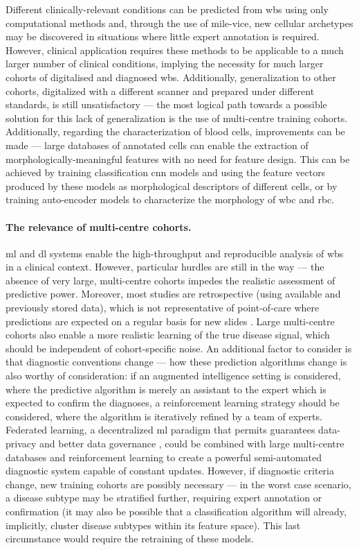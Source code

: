 Different clinically-relevant conditions can be predicted from \ac{wbs} using only computational methods and, through the use of \ac{mile-vice}, new cellular archetypes may be discovered in situations where little expert annotation is required. However, clinical application requires these methods to be applicable to a much larger number of clinical conditions, implying the necessity for much larger cohorts of digitalised and diagnosed \ac{wbs}. Additionally, generalization to other cohorts, digitalized with a different scanner and prepared under different standards, is still unsatisfactory --- the most logical path towards a possible solution for this lack of generalization is the use of multi-centre training cohorts. Additionally, regarding the characterization of blood cells, improvements can be made --- large databases of annotated cells can enable the extraction of morphologically-meaningful features with no need for feature design. This can be achieved by training classification \ac{cnn} models and using the feature vectors produced by these models as morphological descriptors of different cells, or by training auto-encoder models to characterize the morphology of \ac{wbc} and \ac{rbc}. 

\paragraph{The relevance of multi-centre cohorts.} \Ac{ml} and \ac{dl} systems enable the high-throughput and reproducible analysis of \ac{wbs} in a clinical context. However, particular hurdles are still in the way --- the absence of very large, multi-centre cohorts impedes the realistic assessment of predictive power. Moreover, most studies are retrospective (using available and previously stored data), which is not representative of point-of-care where predictions are expected on a regular basis for new slides \cite{Eckardt2020-fp}. Large multi-centre cohorts also enable a more realistic learning of the true disease signal, which should be independent of cohort-specific noise. An additional factor to consider is that diagnostic conventions change --- how these prediction algorithms change is also worthy of consideration: if an augmented intelligence setting is considered, where the predictive algorithm is merely an assistant to the expert which is expected to confirm the diagnoses, a reinforcement learning strategy should be considered, where the algorithm is iteratively refined by a team of experts. Federated learning, a decentralized \ac{ml} paradigm that permits guarantees data-privacy and better data governance \cite{Rieke2020-hl}, could be combined with large multi-centre databases and reinforcement learning to create a powerful semi-automated diagnostic system capable of constant updates. However, if diagnostic criteria change, new training cohorts are possibly necessary --- in the worst case scenario, a disease subtype may be stratified further, requiring expert annotation or confirmation (it may also be possible that a classification algorithm will already, implicitly, cluster disease subtypes within its feature space). This last circumstance would require the retraining of these models.


